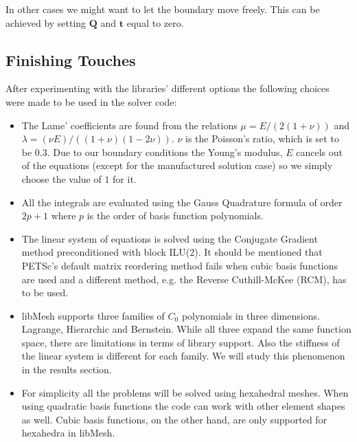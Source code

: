 \documentclass[letter,12pt]{article}
\newcommand*{\hvec}[1]{\mathbf{#1}}
\newcommand*{\hmat}[1]{\mathbf{#1}}
\begin{document}
In other cases we might want to let the boundary move freely. This can
be achieved by setting $\hmat{Q}$ and $\hvec{t}$ equal to zero.

\subsection*{Finishing Touches}

After experimenting with the libraries' different options the following choices
were made to be used in the solver code:

\begin{itemize}

\item The Lame' coefficients are found from the relations $\mu = E /
  (2 (1+\nu))$ and $\lambda = (\nu E)/((1+\nu)(1-2 \nu))$. $\nu$ is
  the Poisson's ratio, which is set to be 0.3. Due to our boundary
  conditions the Young's modulus, $E$ cancels out of the equations (except
  for the manufactured solution case) so we simply choose the value of
  $1$ for it.

\item All the integrals are evaluated using the Gauss Quadrature
  formula of order $2p+1$ where $p$ is the order of basis function
  polynomials.

\item The linear system of equations is solved using the Conjugate
  Gradient method preconditioned with block ILU(2). It should be
  mentioned that PETSc's default matrix reordering method fails when
  cubic basis functions are used and a different method, e.g. the
  Reverse Cuthill-McKee (RCM), has to be used.

\item libMesh supports three families of $C_0$ polynomials in three
  dimensions. Lagrange, Hierarchic\cite{zien} and
  Bernstein\cite{far}. While all three expand the same function space,
  there are limitations in terms of library support. Also the
  stiffness of the linear system is different for each family. We will
  study this phenomenon in the results section.

\item For simplicity all the problems will be solved using hexahedral
  meshes. When using quadratic basis functions the code can work with
  other element shapes as well. Cubic basis functions, on the other
  hand, are only supported for hexahedra in libMesh.

\end{itemize}
\end{document}
